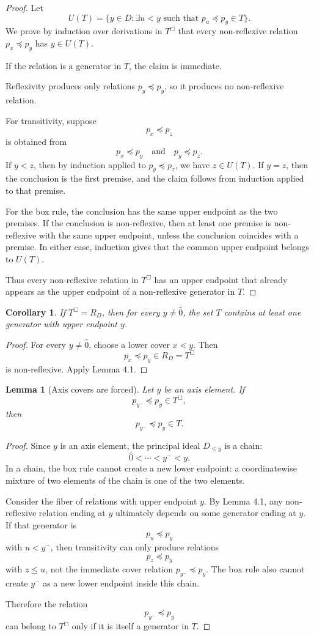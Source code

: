 \documentclass[11pt]{article}
\newtheorem{lemma}[theorem]{Lemma}
\newtheorem{corollary}[theorem]{Corollary}
\begin{document}
\begin{proof}
Let
\[
U(T)=\{y\in D:\exists u<y\text{ such that }p_u\preceq p_y\in T\}.
\]
We prove by induction over derivations in $T^\Box$ that every non-reflexive relation $p_x\preceq p_y$ has $y\in U(T)$.

If the relation is a generator in $T$, the claim is immediate.

Reflexivity produces only relations $p_y\preceq p_y$, so it produces no non-reflexive relation.

For transitivity, suppose
\[
p_x\preceq p_z
\]
is obtained from
\[
p_x\preceq p_y
\quad\text{and}\quad
p_y\preceq p_z.
\]
If $y<z$, then by induction applied to $p_y\preceq p_z$, we have $z\in U(T)$. If $y=z$, then the conclusion is the first premise, and the claim follows from induction applied to that premise.

For the box rule, the conclusion has the same upper endpoint as the two premises. If the conclusion is non-reflexive, then at least one premise is non-reflexive with the same upper endpoint, unless the conclusion coincides with a premise. In either case, induction gives that the common upper endpoint belongs to $U(T)$.

Thus every non-reflexive relation in $T^\Box$ has an upper endpoint that already appears as the upper endpoint of a non-reflexive generator in $T$.
\end{proof}

\begin{corollary}
If $T^\Box=R_D$, then for every $y\ne\hat{0}$, the set $T$ contains at least one generator with upper endpoint $y$.
\end{corollary}

\begin{proof}
For every $y\ne\hat{0}$, choose a lower cover $x\lessdot y$. Then
\[
p_x\preceq p_y\in R_D=T^\Box
\]
is non-reflexive. Apply Lemma 4.1.
\end{proof}

\begin{lemma}[Axis covers are forced]
Let $y$ be an axis element. If
\[
p_{y^-}\preceq p_y\in T^\Box,
\]
then
\[
p_{y^-}\preceq p_y\in T.
\]
\end{lemma}

\begin{proof}
Since $y$ is an axis element, the principal ideal $D_{\le y}$ is a chain:
\[
\hat{0}<\cdots<y^-<y.
\]
In a chain, the box rule cannot create a new lower endpoint: a coordinatewise mixture of two elements of the chain is one of the two elements.

Consider the fiber of relations with upper endpoint $y$. By Lemma 4.1, any non-reflexive relation ending at $y$ ultimately depends on some generator ending at $y$. If that generator is
\[
p_u\preceq p_y
\]
with $u<y^-$, then transitivity can only produce relations
\[
p_z\preceq p_y
\]
with $z\le u$, not the immediate cover relation $p_{y^-}\preceq p_y$. The box rule also cannot create $y^-$ as a new lower endpoint inside this chain.

Therefore the relation
\[
p_{y^-}\preceq p_y
\]
can belong to $T^\Box$ only if it is itself a generator in $T$.
\end{proof}
\end{document}
